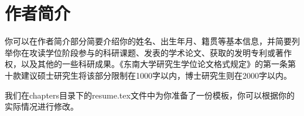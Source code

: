 \begin{tcolorbox}
\begin{lstlisting}[language=TeX]

\end{lstlisting}
\end{tcolorbox}

\section{作者简介}

你可以在作者简介部分简要介绍你的姓名、出生年月、籍贯等基本信息，并简要列举你在攻读学位阶段参与的科研课题、发表的学术论文、获取的发明专利或著作权，以及其他的一些科研成果。《东南大学研究生学位论文格式规定》\cite{seugs2015rule}的第一条第十款建议硕士研究生将该部分限制在1000字以内，博士研究生则在2000字以内。

我们在chapters目录下的resume.tex文件中为你准备了一份模板，你可以根据你的实际情况进行修改。